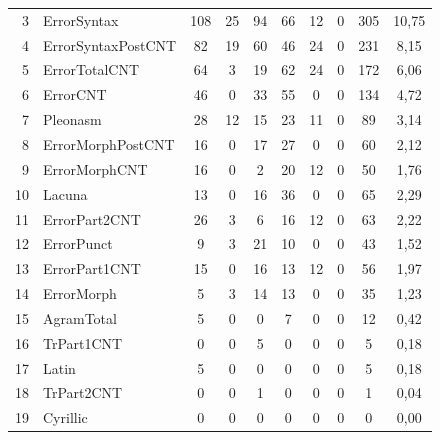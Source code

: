 \begin{table}
\begin{center}
\begin{tabular}{|r|l|c|c|c|c|c|c|c|c|}
3&ErrorSyntax&108\hphantom{9}&25\hphantom{9}&94&66&12&0&305\hphantom{9}&10,75\hphantom{9}\\


4&ErrorSyntaxPostCNT&82&19\hphantom{9}&60&46&24&0&231\hphantom{9}&8,15\\


5&ErrorTotalCNT&64&3&19&62&24&0&172\hphantom{9}&6,06\\


6&ErrorCNT&46&0&33&55&\hphantom{9}0&0&134\hphantom{9}&4,72\\


7&Pleonasm&28&12\hphantom{9}&15&23&11&0&89&3,14\\


8&ErrorMorphPostCNT&16&0&17&27&\hphantom{9}0&0&60&2,12\\


9&ErrorMorphCNT&16&0&\hphantom{9}2&20&12&0&50&1,76\\


10&Lacuna&13&0&16&36&\hphantom{9}0&0&65&2,29\\


11&ErrorPart2CNT&26&3&\hphantom{9}6&16&12&0&63&2,22\\


12&ErrorPunct&\hphantom{9}9&3&21&10&\hphantom{9}0&0&43&1,52\\


13&ErrorPart1CNT&15&0&16&13&12&0&56&1,97\\


14&ErrorMorph&\hphantom{9}5&3&14&13&\hphantom{9}0&0&35&1,23\\


15&AgramTotal&\hphantom{9}5&0&\hphantom{9}0&\hphantom{9}7&\hphantom{9}0&0&12&0,42\\


16&TrPart1CNT&\hphantom{9}0&0&\hphantom{9}5&\hphantom{9}0&\hphantom{9}0&0&\hphantom{9}5&0,18\\


17&Latin&\hphantom{9}5&0&\hphantom{9}0&\hphantom{9}0&\hphantom{9}0&


0&\hphantom{9}5&0,18\\


18&TrPart2CNT&\hphantom{9}0&0&\hphantom{9}1&\hphantom{9}0&\hphantom{9}0&0&\hphantom{9}1&0,04\\


19&Cyrillic&\hphantom{9}0&0&\hphantom{9}0&\hphantom{9}0&\hphantom{9}0


&0&\hphantom{9}0&0,00\\



\end{tabular}
\end{center}
\end{table}

